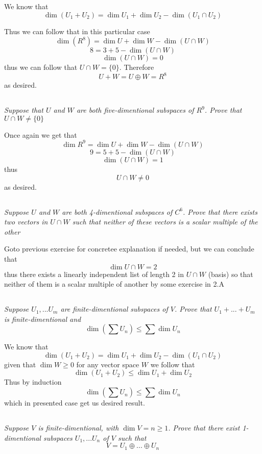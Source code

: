 \documentclass[11pt,oneside,titlepage]{book}
\begin{document}
We know that
$$\dim (U_1 + U_2) = \dim U_1 + \dim U_2 - \dim (U_1 \cap U_2)$$

Thus we can follow that in this particular case
$$\dim (R^8) = \dim U + \dim W - \dim (U \cap W)$$
$$8 = 3 + 5 - \dim (U \cap W)$$
$$\dim (U \cap W) = 0$$
thus we can follow that $U \cap W = \{0\}$. Therefore
$$U + W = U \oplus W = R^8$$
as desired.

\subsection{}
\textit{Suppose that $U$ and $W$ are both five-dimentional subspaces of $R^9$.
  Prove that $U \cap W \neq \{0\}$}

Once again we get that
$$\dim R^9 = \dim U + \dim W - \dim (U \cap W)$$
$$9 = 5 + 5- \dim (U \cap W)$$
$$\dim (U \cap W) = 1$$
thus
$$U \cap W \neq 0$$
as desired.

\subsection{}
\textit{Suppose $U$ and $W$ are both 4-dimentional subspaces of $C^6$. Prove
  that there exists two vectors in $U \cap W$ such that neither of these
  vectors is a scalar multiple of the other}

Goto previous exercise for concretee explanation if needed, but  we can 
conclude that
$$\dim U \cap W = 2$$
thus there exists a linearly independent list of length 2 in $U \cap W$ (basis)
so that neither of them is a scalar multiple of another by some exercise in 2.A

\subsection{}
\textit{Suppose $U_1, ... U_m$ are finite-dimentional subspaces of $V$.
  Prove that $U_1 + ... + U_m$ is finite-dimentional and }
$$\dim(\sum U_n) \leq \sum{\dim U_n}$$

We know that 
$$\dim (U_1 + U_2) = \dim U_1 + \dim U_2 - \dim (U_1 \cap U_2)$$
given that $\dim W \geq 0$ for any vector space $W$ we follow that
$$\dim (U_1 + U_2) \leq \dim U_1 + \dim U_2$$
Thus by induction
$$\dim(\sum U_n) \leq  \sum \dim U_n $$
which in presented case get us desired result.

\subsection{}
\textit{Suppose $V$ is finite-dimentional, with $\dim V = n \geq 1$. Prove
  that there exist 1-dimentional subspaces $U_1, ... U_n$ of $V$ such that  
}
$$V = U_1 \oplus ... \oplus U_n$$
\end{document}
